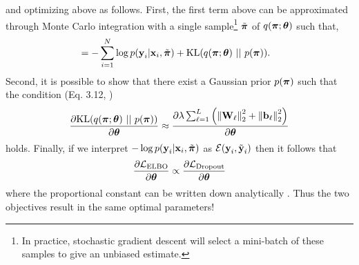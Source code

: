and optimizing  above as follows. First, the first term above can be approximated through Monte Carlo integration with a single sample\footnote{In practice, stochastic gradient descent will select a mini-batch of these samples to give an unbiased estimate.} $\tilde{\boldsymbol{\mathbf{\pi}}}$ of $q(\boldsymbol{\mathbf{\pi}}; \boldsymbol{\mathbf{\theta}})$ such that, 
\begin{align}
	&= - \sum_{i=1}^N \log p(\boldsymbol{\mathbf{y}}_i | \boldsymbol{\mathbf{x}}_i, \tilde{\boldsymbol{\mathbf{\pi}}})  + \text{KL}(q(\boldsymbol{\mathbf{\pi}}; \boldsymbol{\mathbf{\theta}}) ~ || ~ p(\boldsymbol{\mathbf{\pi}})).
\end{align}
Second, it is possible to show that there exist a Gaussian prior $p(\boldsymbol{\mathbf{\pi}})$ such that the condition (Eq. 3.12, \cite{Gal2016UncertaintyThesis})
\begin{align}
\dfrac{\partial \text{KL}(q(\boldsymbol{\mathbf{\pi}}; \boldsymbol{\mathbf{\theta}}) ~ || ~ p(\boldsymbol{\mathbf{\pi}}))}{\partial \boldsymbol{\mathbf{\theta}}} \approx \dfrac{\partial \lambda \sum_{\ell=1}^L	\left( \left\Vert\boldsymbol{\mathbf{W}}_\ell\right\Vert_2^2 +  \left\Vert\boldsymbol{\mathbf{b}}_\ell\right\Vert_2^2\right)}{\partial \boldsymbol{\mathbf{\theta}}}	
\end{align}
holds. Finally, if we interpret $-\log p(\boldsymbol{\mathbf{y}}_i | \boldsymbol{\mathbf{x}}_i, \tilde{\boldsymbol{\mathbf{\pi}}})$ as $\mathcal{E}(\boldsymbol{\mathbf{y}}_i, \tilde{\boldsymbol{\mathbf{y}}}_i)$ then it follows that
\begin{align}
\dfrac{\partial \mathcal{L}_{\text{ELBO}}}{\partial \boldsymbol{\mathbf{\theta}}} \propto \dfrac{\partial \mathcal{L}_{\text{Dropout}}}{\partial \boldsymbol{\mathbf{\theta}}}
\end{align} where the proportional constant can be written down analytically \citep{Gal2016UncertaintyThesis}. Thus the two objectives result in the same optimal parameters!
